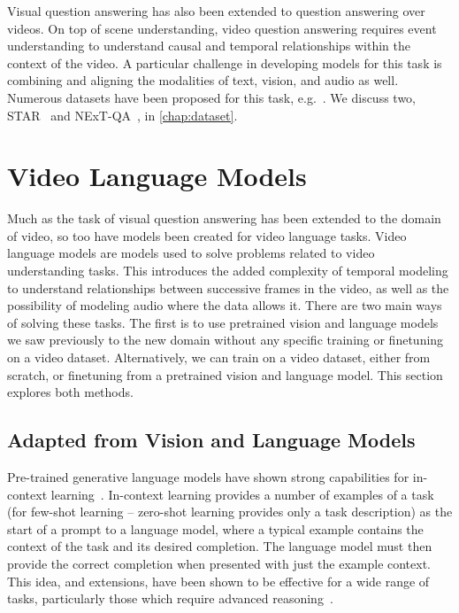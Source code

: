Visual question answering has also been extended to question answering over
videos. On top of scene understanding, video question answering requires event
understanding to understand causal and temporal relationships within the
context of the video. A particular challenge in developing models for this task
is combining and aligning the modalities of text, vision, and audio as well.
Numerous datasets have been proposed for this task,
e.g.~\citet{xu2016msr-vtt,wu2021star,xiao2021nextqa,lei2020tvqaplus}. We discuss
two, STAR~\citep{wu2021star} and NExT-QA~\citep{xiao2021nextqa}, in
\cref{chap:dataset}.


\section{Video Language Models}
\label{sec:vidlma}

Much as the task of visual question answering has been extended to the domain
of video, so too have models been created for video language tasks. Video
language models are models used to solve problems related to video
understanding tasks. This introduces the added complexity of temporal modeling
to understand relationships between successive frames in the video, as well as
the possibility of modeling audio where the data allows it. There are two main
ways of solving these tasks. The first is to use pretrained vision and language
models we saw previously to the new domain without any specific training or
finetuning on a video dataset.  Alternatively, we can train on a video dataset,
either from scratch, or finetuning from a pretrained vision and language model.
This section explores both methods.

\subsection{Adapted from Vision and Language Models}
\label{ssec:adaptvlm}

Pre-trained generative language models have shown strong capabilities for
in-context learning~\citep{brown2020gpt3}. In-context learning provides a number
of examples of a task (for few-shot learning -- zero-shot learning provides only
a task description) as the start of a prompt to a language model, where a
typical example contains the context of the task and its desired completion.
The language model must then provide the correct completion when presented with
just the example context. This idea, and extensions, have been shown to be
effective for a wide range of tasks, particularly those which require advanced
reasoning~\citep{wei2022cot,kojima2022step}.

